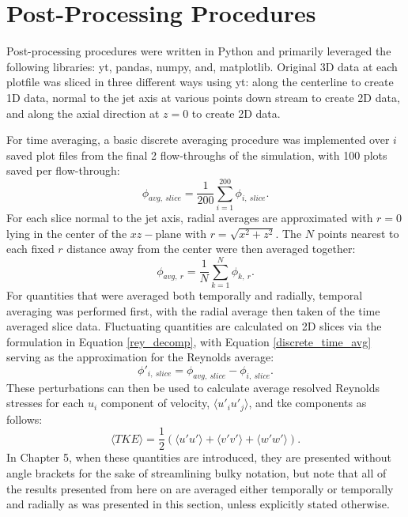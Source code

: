 \section{Post-Processing Procedures}
Post-processing procedures were written in Python and primarily leveraged the following libraries: yt, pandas, numpy, and, matplotlib. Original 3D data at each plotfile was sliced in three different ways using yt: along the centerline to create 1D data, normal to the jet axis at various points down stream to create 2D data, and along the axial direction at $z=0$ to create 2D data. 

For time averaging, a basic discrete averaging procedure was implemented over $i$ saved plot files from the final 2 flow-throughs of the simulation, with 100 plots saved per flow-through:
\begin{equation} \label{discrete_time_avg}
\phi_{avg,\ slice} = \dfrac{1}{200} \sum\limits_{i=1}^{200} \phi_{i,\ slice}.
\end{equation}
For each slice normal to the jet axis, radial averages are approximated with $r = 0$ lying in the center of the $xz-$plane with $r = \sqrt{x^2 + z^2}$. The $N$ points nearest to each fixed $r$ distance away from the center were then averaged together:
\begin{equation} \label{discrete_time_avg}
\phi_{avg,\ r} = \dfrac{1}{N} \sum\limits_{k=1}^{N} \phi_{k,\ r}.
\end{equation}
For quantities that were averaged both temporally and radially, temporal averaging was performed first, with the radial average then taken of the time averaged slice data. Fluctuating quantities are calculated on 2D slices via the formulation in Equation \eqref{rey_decomp}, with Equation \eqref{discrete_time_avg} serving as the approximation for the Reynolds average:
\begin{equation} \label{discrete_rey_decomp}
\phi'_{i,\ slice} = \phi_{avg,\ slice} - \phi_{i,\ slice}.
\end{equation}
These perturbations can then be used to calculate average resolved Reynolds stresses for each $u_i$ component of velocity, $\langle u'_i u'_j \rangle$, and \gls{tke} components \cite{iso_comp_2} as follows: 
\begin{equation} \label{TKE}
\langle TKE \rangle = \dfrac{1}{2} \left( \langle u' u' \rangle + \langle v' v' \rangle + \langle w' w' \rangle  \right).
\end{equation}
In Chapter 5, when these quantities are introduced, they are presented without angle brackets for the sake of streamlining bulky notation, but note that all of the results presented from here on are averaged either temporally or temporally and radially as was presented in this section, unless explicitly stated otherwise. 

